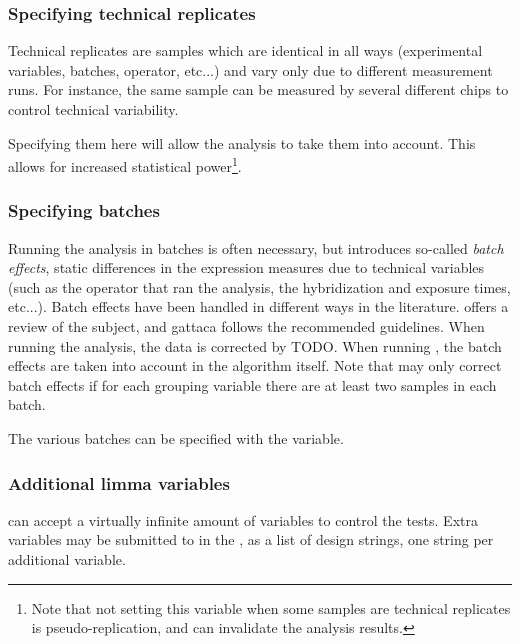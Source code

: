 
\subsubsection{Specifying technical replicates}
Technical replicates are samples which are identical in all ways (experimental variables, batches, operator, etc...) and vary only due to different measurement runs. For instance, the same sample can be measured by several different chips to control technical variability.

Specifying them here will allow the analysis to take them into account. This allows for increased statistical power\footnote{Note that not setting this variable when some samples are technical replicates is pseudo-replication, and can invalidate the analysis results.}.

\subsubsection{Specifying batches}
Running the analysis in batches is often necessary, but introduces so-called \textit{batch effects}, static differences in the expression measures due to technical variables (such as the operator that ran the analysis, the hybridization and exposure times, etc...). Batch effects have been handled in different ways in the literature. \textcite{nygaardMethodsThatRemove2016} offers a review of the subject, and \gls{gattaca} follows the recommended guidelines. When running the  analysis, the data is corrected by TODO. When running , the batch effects are taken into account in the algorithm itself. Note that  may only correct batch effects if for each grouping variable there are at least two samples in each batch.

The various batches can be specified with the  variable.

\subsubsection{Additional limma variables}

 can accept a virtually infinite amount of variables to control the tests. Extra variables may be submitted to  in the , as a list of design strings, one string per additional variable.

